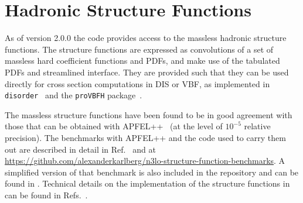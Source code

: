 

\section{Hadronic Structure Functions}
\label{sec:structure-funcs}
As of \hoppet version 2.0.0 the code provides access to the massless
hadronic structure functions. The structure functions are expressed as
convolutions of a set of massless hard coefficient functions and PDFs,
and make use of the tabulated PDFs and streamlined interface.  They
are provided such that they can be used directly for cross section
computations in DIS or VBF, as implemented in {\tt
  disorder}~\cite{Karlberg:2024hnl} and the {\tt proVBFH}
package~\cite{Cacciari:2015jma,Dreyer:2016oyx,Dreyer:2018qbw,Dreyer:2018rfu}.

The massless structure functions have been found to be in good
agreement with those that can be obtained with
APFEL++~\cite{Bertone:2013vaa,Bertone:2017gds} (at the level of
$10^{-5}$ relative precision).
%
The benchmarks with APFEL++ and the code used to carry them out are
described in detail in Ref.~\cite{Bertone:2024dpm} and at
\url{https://github.com/alexanderkarlberg/n3lo-structure-function-benchmarks}. A
simplified version of that benchmark is also included in the \hoppet{}
repository and can be found in
.
%
Technical details on the implementation of the structure functions in
\hoppet can be found in
Refs.~\cite{Dreyer:2016vbc,Karlberg:2016zik,Bertone:2024dpm}.

